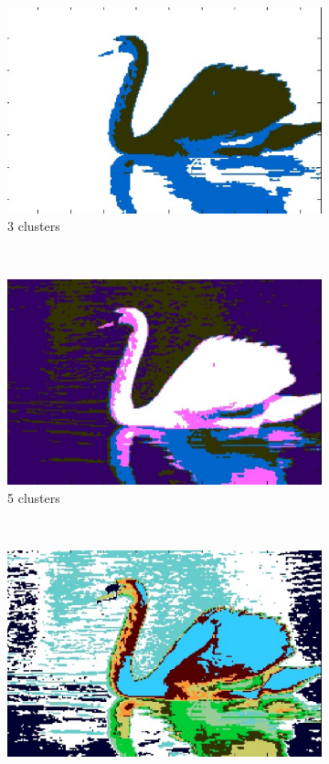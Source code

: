 \documentclass[10pt,twocolumn,letterpaper]{article}
\begin{document}
\begin{figure}
    \centering
    \begin{subfigure}[b]{0.2\textwidth}
        \includegraphics[width=\textwidth]{8068Hier3.eps}
        \caption{3 clusters}
        \label{fig:clust3}
    \end{subfigure}
    ~ 
    \begin{subfigure}[b]{0.2\textwidth}
        \includegraphics[width=\textwidth]{8068Hier5.eps}
        \caption{5 clusters}
        \label{fig:clust5}
    \end{subfigure}
    ~ 
    \begin{subfigure}[b]{0.2\textwidth}
        \includegraphics[width=\textwidth]{8068Hier10.eps}

\end{subfigure}
\end{figure}
\end{document}
